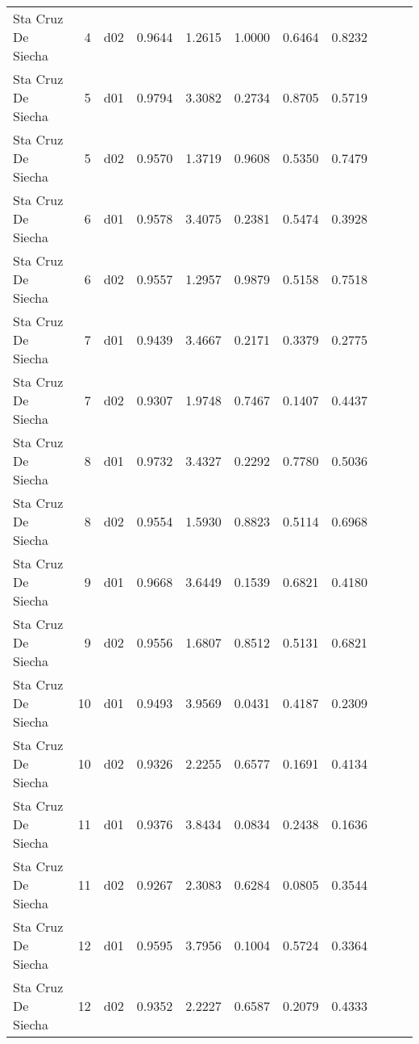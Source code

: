 \begin{landscape}
\begin{longtable}{p{2cm}rrrrrrrrrr}
   Sta Cruz De Siecha  &          4 &     d02 &   0.9644 &  1.2615 &        1.0000 &           0.6464 &  0.8232 \\
   Sta Cruz De Siecha  &          5 &     d01 &   0.9794 &  3.3082 &        0.2734 &           0.8705 &  0.5719 \\
   Sta Cruz De Siecha  &          5 &     d02 &   0.9570 &  1.3719 &        0.9608 &           0.5350 &  0.7479 \\
   Sta Cruz De Siecha  &          6 &     d01 &   0.9578 &  3.4075 &        0.2381 &           0.5474 &  0.3928 \\
   Sta Cruz De Siecha  &          6 &     d02 &   0.9557 &  1.2957 &        0.9879 &           0.5158 &  0.7518 \\
   Sta Cruz De Siecha  &          7 &     d01 &   0.9439 &  3.4667 &        0.2171 &           0.3379 &  0.2775 \\
   Sta Cruz De Siecha  &          7 &     d02 &   0.9307 &  1.9748 &        0.7467 &           0.1407 &  0.4437 \\
   Sta Cruz De Siecha  &          8 &     d01 &   0.9732 &  3.4327 &        0.2292 &           0.7780 &  0.5036 \\
   Sta Cruz De Siecha  &          8 &     d02 &   0.9554 &  1.5930 &        0.8823 &           0.5114 &  0.6968 \\
   Sta Cruz De Siecha  &          9 &     d01 &   0.9668 &  3.6449 &        0.1539 &           0.6821 &  0.4180 \\
   Sta Cruz De Siecha  &          9 &     d02 &   0.9556 &  1.6807 &        0.8512 &           0.5131 &  0.6821 \\
   Sta Cruz De Siecha  &         10 &     d01 &   0.9493 &  3.9569 &        0.0431 &           0.4187 &  0.2309 \\
   Sta Cruz De Siecha  &         10 &     d02 &   0.9326 &  2.2255 &        0.6577 &           0.1691 &  0.4134 \\
   Sta Cruz De Siecha  &         11 &     d01 &   0.9376 &  3.8434 &        0.0834 &           0.2438 &  0.1636 \\
   Sta Cruz De Siecha  &         11 &     d02 &   0.9267 &  2.3083 &        0.6284 &           0.0805 &  0.3544 \\
   Sta Cruz De Siecha  &         12 &     d01 &   0.9595 &  3.7956 &        0.1004 &           0.5724 &  0.3364 \\
   Sta Cruz De Siecha  &         12 &     d02 &   0.9352 &  2.2227 &        0.6587 &           0.2079 &  0.4333 \\

\end{longtable}
\end{landscape}
